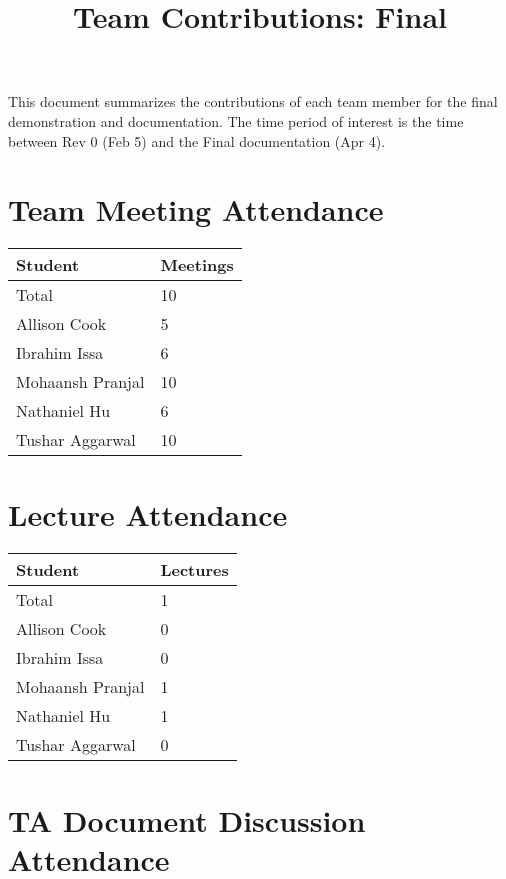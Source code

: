 \documentclass{article}
\title{Team Contributions: Final\\\progname}
\author{\authname}
\date{}
\begin{document}
\maketitle
This document summarizes the contributions of each team member for the final
demonstration and documentation.  The time period of interest is the time
between Rev 0 (Feb 5) and the Final documentation (Apr 4).

\section{Team Meeting Attendance}


\begin{table}[H]
\centering
\begin{tabular}{ll}
\toprule
\textbf{Student} & \textbf{Meetings}\\
\midrule
Total & 10\\
Allison Cook & 5 \\
Ibrahim Issa & 6 \\
Mohaansh Pranjal & 10 \\
Nathaniel Hu & 6 \\
Tushar Aggarwal & 10 \\
\bottomrule
\end{tabular}
\end{table}


\section{Lecture Attendance}

\begin{table}[H]
\centering
\begin{tabular}{ll}
\toprule
\textbf{Student} & \textbf{Lectures}\\
\midrule
Total & 1\\
Allison Cook & 0 \\
Ibrahim Issa & 0 \\
Mohaansh Pranjal & 1 \\
Nathaniel Hu & 1 \\
Tushar Aggarwal & 0 \\
\bottomrule
\end{tabular}
\end{table}


\section{TA Document Discussion Attendance}
\end{document}
